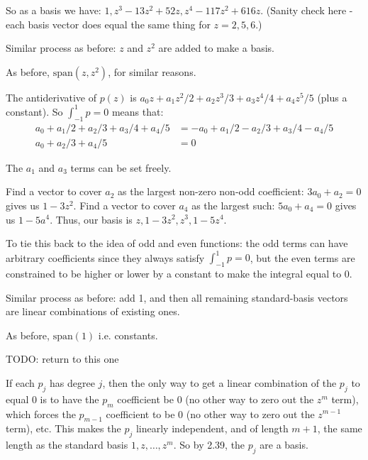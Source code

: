 \documentclass{article}
\begin{document}
So as a basis we have: $1, z^3 - 13z^2 + 52z, z^4 - 117z^2 + 616z$. (Sanity
check here - each basis vector does equal the same thing for $z = 2, 5, 6$.)


Similar process as before: $z$ and $z^2$ are added to make a basis.


As before, $\text{span}(z, z^2)$, for similar reasons.


The antiderivative of $p(z)$ is $a_0z + a_1z^2/2 + a_2z^3/3 + a_3z^4/4 +
a_4z^5/5$ (plus a constant). So $\int_{-1}^1 p = 0$ means that:
\begin{align*}
  a_0 + a_1/2 + a_2/3 + a_3/4 + a_4/5 & = -a_0 + a_1/2 - a_2/3 + a_3/4 - a_4/5 \\
  a_0 + a_2/3 + a_4/5 & = 0
\end{align*}

The $a_1$ and $a_3$ terms can be set freely.

Find a vector to cover $a_2$ as the largest non-zero non-odd coefficient: $3a_0
+ a_2 = 0$ gives us $1 - 3z^2$. Find a vector to cover $a_4$ as the largest
such: $5a_0 + a_4 = 0$ gives us $1 - 5a^4$. Thus, our basis is $z, 1 - 3z^2,
z^3, 1 - 5z^4$.

To tie this back to the idea of odd and even functions: the odd terms can have
arbitrary coefficients since they always satisfy $\int_{-1}^1 p = 0$, but the
even terms are constrained to be higher or lower by a constant to make the
integral equal to 0.


Similar process as before: add 1, and then all remaining standard-basis vectors
are linear combinations of existing ones.


As before, $\text{span}(1)$ i.e. constants.


TODO: return to this one


If each $p_j$ has degree $j$, then the only way to get a linear combination of
the $p_j$ to equal 0 is to have the $p_m$ coefficient be 0 (no other way to zero
out the $z^m$ term), which forces the $p_{m-1}$ coefficient to be 0 (no other
way to zero out the $z^{m-1}$ term), etc. This makes the $p_j$ linearly
independent, and of length $m+1$, the same length as the standard basis $1, z,
\ldots, z^m$. So by 2.39, the $p_j$ are a basis.
\end{document}
